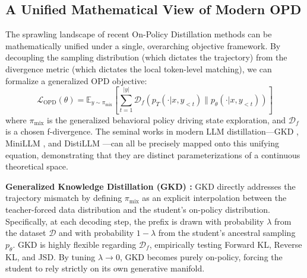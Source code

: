 \documentclass{article} %
\newcommand{\ptheta}{p_\theta}
\newcommand{\pteacher}{p_T}
\newcommand{\loss}{\mathcal{L}}
\begin{document}
\subsection{A Unified Mathematical View of Modern OPD}
\label{subsec:unified_view}

The sprawling landscape of recent On-Policy Distillation methods can be mathematically unified under a single, overarching objective framework. By decoupling the sampling distribution (which dictates the trajectory) from the divergence metric (which dictates the local token-level matching), we can formalize a generalized OPD objective:
\begin{equation}
    \loss_{\mathrm{OPD}}(\theta) = \mathbb{E}_{y \sim \pi_{\mathrm{mix}}} \left[ \sum_{t=1}^{|y|} \mathcal{D}_f \left( \pteacher(\cdot | x, y_{<t}) \parallel \ptheta(\cdot | x, y_{<t}) \right) \right]
\end{equation}
where $\pi_{\mathrm{mix}}$ is the generalized behavioral policy driving state exploration, and $\mathcal{D}_f$ is a chosen f-divergence. The seminal works in modern LLM distillation—GKD \citep{2306.13649}, MiniLLM \citep{2306.08543}, and DistiLLM \citep{2402.03898}—can all be precisely mapped onto this unifying equation, demonstrating that they are distinct parameterizations of a continuous theoretical space.

\textbf{Generalized Knowledge Distillation (GKD) \citep{2306.13649}:} GKD directly addresses the trajectory mismatch by defining $\pi_{\mathrm{mix}}$ as an explicit interpolation between the teacher-forced data distribution and the student's on-policy distribution. Specifically, at each decoding step, the prefix is drawn with probability $\lambda$ from the dataset $\mathcal{D}$ and with probability $1-\lambda$ from the student's ancestral sampling $\ptheta$. GKD is highly flexible regarding $\mathcal{D}_f$, empirically testing Forward KL, Reverse KL, and JSD. By tuning $\lambda \to 0$, GKD becomes purely on-policy, forcing the student to rely strictly on its own generative manifold.
\end{document}
